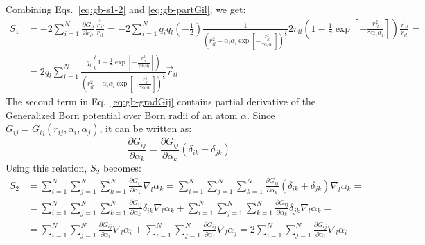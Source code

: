 \documentclass[11pt]{book}
\begin{document}
Combining Eqs.~\ref{eq:gb-s1-2} and \ref{eq:gb-partGil}, we get:
\begin{equation}\label{eq:gb-s1-3}
\begin{split}
S_{1}&=-2\sum_{i=1}^{N}\frac{\partial G_{il}}{\partial r_{il}}\frac{\vec{r}_{il}}{r_{il}}=-2\sum_{i=1}^{N}q_{i}q_{l}\left(-\frac{1}{2}\right)\frac{1}{\left(r_{il}^{2}+\alpha_{i}\alpha_{l}\exp{\left[-\frac{r_{il}^{2}}{\gamma\alpha_{i}\alpha_{l}}\right]}\right)^{\frac{3}{2}}}2r_{il}\left(1-\frac{1}{\gamma}\exp{\left[-\frac{r_{il}^{2}}{\gamma\alpha_{i}\alpha_{l}}\right]}\right)\frac{\vec{r}_{il}}{r_{il}}=\\
&=2q_{l}\sum_{i=1}^{N}\frac{q_{i}\left(1-\frac{1}{\gamma}\exp{\left[-\frac{r_{il}^{2}}{\gamma\alpha_{i}\alpha_{l}}\right]}\right)}{\left(r_{il}^{2}+\alpha_{i}\alpha_{l}\exp{\left[-\frac{r_{il}^{2}}{\gamma\alpha_{i}\alpha_{l}}\right]}\right)^{\frac{3}{2}}}\vec{r}_{il}
\end{split}
\end{equation}
The second term in Eq.~\ref{eq:gb-gradGij} contains partial derivative of the Generalized Born potential over Born radii of an atom $\alpha$. Since $G_{ij}=G_{ij}(r_{ij},\alpha_{i},\alpha_{j})$, it can be written as:
\begin{equation}\label{eq:gb-partGalpha}
\frac{\partial G_{ij}}{\partial \alpha_{k}}=\frac{\partial G_{ij}}{\partial \alpha_{k}}(\delta_{ik}+\delta_{jk}).
\end{equation}
Using this relation, $S_{2}$ becomes:
\begin{equation}\label{eq:gb-s2-1}
\begin{split}
S_{2}&=\sum_{i=1}^{N}\sum_{j=1}^{N}\sum_{k=1}^{N}\frac{\partial G_{ij}}{\partial \alpha_{k}}\nabla_{l}\alpha_{k}=\sum_{i=1}^{N}\sum_{j=1}^{N}\sum_{k=1}^{N}\frac{\partial G_{ij}}{\partial \alpha_{k}}(\delta_{ik}+\delta_{jk})\nabla_{l}\alpha_{k}=\\
&=\sum_{i=1}^{N}\sum_{j=1}^{N}\sum_{k=1}^{N}\frac{\partial G_{ij}}{\partial \alpha_{k}}\delta_{ik}\nabla_{l}\alpha_{k}+\sum_{i=1}^{N}\sum_{j=1}^{N}\sum_{k=1}^{N}\frac{\partial G_{ij}}{\partial \alpha_{k}}\delta_{jk}\nabla_{l}\alpha_{k}=\\
&=\sum_{i=1}^{N}\sum_{j=1}^{N}\frac{\partial G_{ij}}{\partial \alpha_{i}}\nabla_{l}\alpha_{i}+\sum_{i=1}^{N}\sum_{j=1}^{N}\frac{\partial G_{ij}}{\partial \alpha_{j}}\nabla_{l}\alpha_{j}=2\sum_{i=1}^{N}\sum_{j=1}^{N}\frac{\partial G_{ij}}{\partial \alpha_{i}}\nabla_{l}\alpha_{i}
\end{split}
\end{equation}
\end{document}
